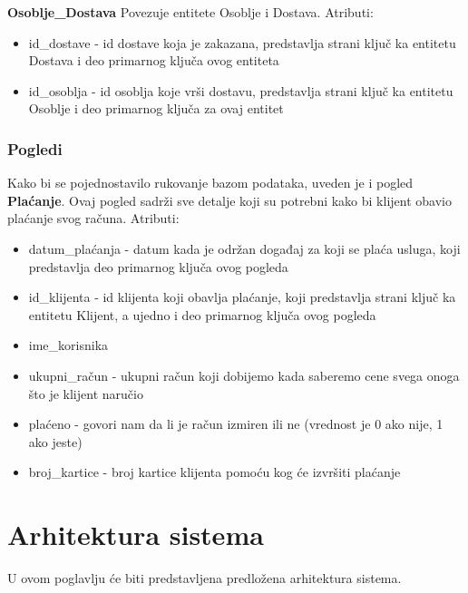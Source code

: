 \documentclass[a4paper]{article}
\begin{document}
\vspace{3mm}

\textbf{Osoblje\_Dostava} Povezuje entitete Osoblje i Dostava. Atributi:
\begin{itemize}
    \item id\_dostave - id dostave koja je zakazana, predstavlja strani ključ ka entitetu Dostava i deo primarnog ključa ovog entiteta
    \item id\_osoblja - id osoblja koje vrši dostavu, predstavlja strani ključ ka entitetu Osoblje i deo primarnog ključa za ovaj entitet
    
\end{itemize}

\vspace{3mm}


\subsubsection{Pogledi}

Kako bi se pojednostavilo rukovanje bazom podataka, uveden je i pogled \textbf{Plaćanje}. Ovaj pogled sadrži sve detalje koji su potrebni kako bi klijent obavio plaćanje svog računa. Atributi:
\begin{itemize}
    \item datum\_plaćanja - datum kada je održan događaj za koji se plaća usluga, koji predstavlja deo primarnog ključa ovog pogleda
    \item id\_klijenta - id klijenta koji obavlja plaćanje, koji predstavlja strani ključ ka entitetu Klijent, a ujedno i deo primarnog ključa ovog pogleda
    \item ime\_korisnika 
    \item ukupni\_račun - ukupni račun koji dobijemo kada saberemo cene svega onoga što je klijent naručio
    \item plaćeno - govori nam da li je račun izmiren ili ne (vrednost je 0 ako nije, 1 ako jeste)
    \item broj\_kartice - broj kartice klijenta pomoću kog će izvršiti plaćanje
\end{itemize}

\section{Arhitektura sistema}
U ovom poglavlju će biti predstavljena predložena arhitektura sistema.
\end{document}
